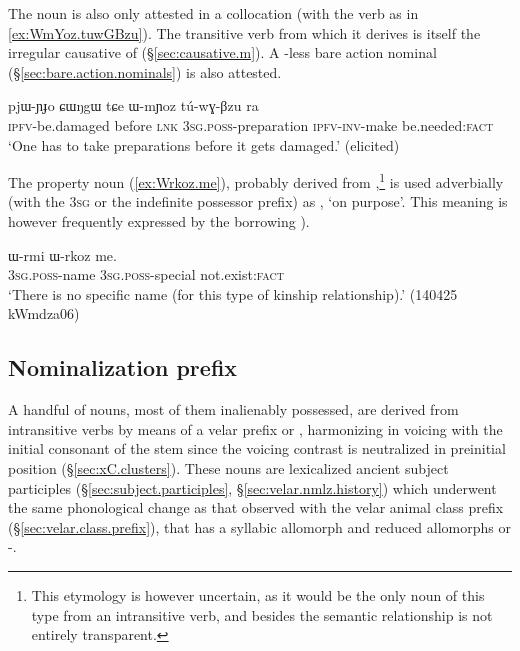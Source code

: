 The noun  is also only attested in a collocation  (with the verb  as in \ref{ex:WmYoz.tuwGBzu}). The transitive verb  from which it derives is itself the irregular causative of  (§\ref{sec:causative.m}). A -less bare action nominal  (§\ref{sec:bare.action.nominals}) is also attested.

\begin{exe}
\ex \label{ex:WmYoz.tuwGBzu}
\gll  pjɯ-ɲɟo ɕɯŋgɯ tɕe ɯ-mɲoz tú-wɣ-βzu ra \\
\textsc{ipfv}-be.damaged before \textsc{lnk} \textsc{3sg}.\textsc{poss}-preparation \textsc{ipfv}-\textsc{inv}-make be.needed:\textsc{fact} \\
\glt `One has to take preparations before it gets damaged.' (elicited)
\end{exe}
 
The property noun  (\ref{ex:Wrkoz.me}), probably derived from ,\footnote{This etymology is however uncertain, as it would be the only noun of this type from an intransitive verb, and besides the semantic relationship is not entirely transparent.  }  is used adverbially (with the \textsc{3sg} or the indefinite possessor prefix) as  , `on purpose'. This meaning is however frequently expressed by the borrowing ).

\begin{exe}
\ex \label{ex:Wrkoz.me}
\gll ɯ-rmi ɯ-rkoz me. \\
\textsc{3sg}.\textsc{poss}-name \textsc{3sg}.\textsc{poss}-special not.exist:\textsc{fact} \\
\glt `There is no specific name (for this type of kinship relationship).' (140425 kWmdza06)
\end{exe}




\subsection{Nominalization  prefix} \label{sec:G.nmlz}
A handful of nouns, most of them inalienably possessed, are derived from intransitive verbs by means of a velar prefix   or , harmonizing in voicing with the initial consonant of the stem since the voicing contrast is neutralized in preinitial position (§\ref{sec:xC.clusters}). These nouns are lexicalized ancient subject participles (§\ref{sec:subject.participles}, §\ref{sec:velar.nmlz.history}) which underwent the same phonological change as that observed with the velar animal class prefix (§\ref{sec:velar.class.prefix}), that has a syllabic allomorph  and reduced allomorphs  or -. 

